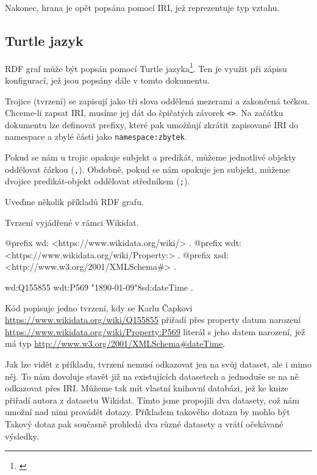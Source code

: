 Nakonec, hrana je opět popsána pomocí IRI, jež reprezentuje typ vztahu.

\subsection{Turtle jazyk}
RDF graf může být popsán pomocí Turtle jazyka\footnote{\citet{Prud'hommeaux:14:RT}}. Ten je využit při zápisu konfigurací, jež jsou popsány dále v tomto dokumentu.

Trojice (tvrzení) se zapisují jako tři slova oddělená mezerami a zakončená tečkou. Chceme-li zapsat IRI, musíme jej dát do špičatých závorek \texttt{<>}. Na začátku dokumentu lze definovat prefixy, které pak umožňují zkrátit zapisované IRI do namespace a zbylé části jako \texttt{namespace:zbytek}.

Pokud se nám u trojic opakuje subjekt a predikát, můžeme jednotlivé objekty oddělovat čárkou (\texttt{,}). Obdobně, pokud se nám opakuje jen subjekt, můžeme dvojice predikát-objekt oddělovat středníkem (\texttt{;}).

\newpage

Uveďme několik příkladů RDF grafu.

\begin{prikl}
Tvrzení  vyjádřené v rámci Wikidat.
\begin{code}
@prefix wd: <https://www.wikidata.org/wiki/> .
@prefix wdt: <https://www.wikidata.org/wiki/Property:> .
@prefix xsd: <http://www.w3.org/2001/XMLSchema#> .

wd:Q155855 wdt:P569 "1890-01-09"^^xsd:dateTime .
\end{code}

Kód popisuje jedno tvrzení, kdy se Karlu Čapkovi \\ \url{https://www.wikidata.org/wiki/Q155855} přiřadí přes property datum narození \url{https://www.wikidata.org/wiki/Property:P569} literál s jeho datem narození, jež má typ \url{http://www.w3.org/2001/XMLSchema#dateTime}.
\end{prikl}

Jak lze vidět z příkladu, tvrzení nemusí odkazovat jen na svůj dataset, ale i mimo něj. To nám dovoluje stavět již na existujících datasetech a jednoduše se na ně odkazovat přes IRI. Můžeme tak mít vlastní knihovní databázi, jež ke knize přiřadí autora z datasetu Wikidat. Tímto jsme propojili dva datasety, což nám umožní nad nimi provádět dotazy. Příkladem takového dotazu by mohlo být  Takový dotaz pak současně prohledá dva různé datasety a vrátí očekávané výsledky.

